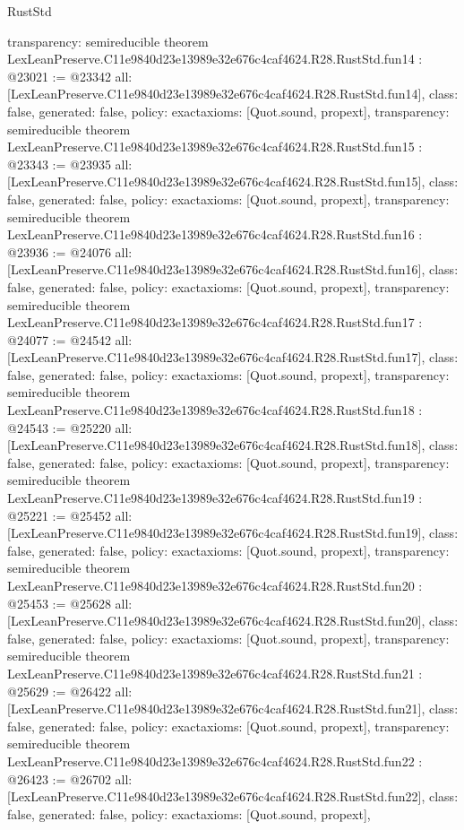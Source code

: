 \begin{lexlean}{RustStd}
\begin{coremodule}
{  transparency: semireducible
}
theorem LexLeanPreserve.C11e9840d23e13989e32e676c4caf4624.R28.RustStd.fun14 : @23021 := @23342 {
  all: [LexLeanPreserve.C11e9840d23e13989e32e676c4caf4624.R28.RustStd.fun14],
  class: false,
  generated: false,
  policy: exact{axioms: [Quot.sound, propext]},
  transparency: semireducible
}
theorem LexLeanPreserve.C11e9840d23e13989e32e676c4caf4624.R28.RustStd.fun15 : @23343 := @23935 {
  all: [LexLeanPreserve.C11e9840d23e13989e32e676c4caf4624.R28.RustStd.fun15],
  class: false,
  generated: false,
  policy: exact{axioms: [Quot.sound, propext]},
  transparency: semireducible
}
theorem LexLeanPreserve.C11e9840d23e13989e32e676c4caf4624.R28.RustStd.fun16 : @23936 := @24076 {
  all: [LexLeanPreserve.C11e9840d23e13989e32e676c4caf4624.R28.RustStd.fun16],
  class: false,
  generated: false,
  policy: exact{axioms: [Quot.sound, propext]},
  transparency: semireducible
}
theorem LexLeanPreserve.C11e9840d23e13989e32e676c4caf4624.R28.RustStd.fun17 : @24077 := @24542 {
  all: [LexLeanPreserve.C11e9840d23e13989e32e676c4caf4624.R28.RustStd.fun17],
  class: false,
  generated: false,
  policy: exact{axioms: [Quot.sound, propext]},
  transparency: semireducible
}
theorem LexLeanPreserve.C11e9840d23e13989e32e676c4caf4624.R28.RustStd.fun18 : @24543 := @25220 {
  all: [LexLeanPreserve.C11e9840d23e13989e32e676c4caf4624.R28.RustStd.fun18],
  class: false,
  generated: false,
  policy: exact{axioms: [Quot.sound, propext]},
  transparency: semireducible
}
theorem LexLeanPreserve.C11e9840d23e13989e32e676c4caf4624.R28.RustStd.fun19 : @25221 := @25452 {
  all: [LexLeanPreserve.C11e9840d23e13989e32e676c4caf4624.R28.RustStd.fun19],
  class: false,
  generated: false,
  policy: exact{axioms: [Quot.sound, propext]},
  transparency: semireducible
}
theorem LexLeanPreserve.C11e9840d23e13989e32e676c4caf4624.R28.RustStd.fun20 : @25453 := @25628 {
  all: [LexLeanPreserve.C11e9840d23e13989e32e676c4caf4624.R28.RustStd.fun20],
  class: false,
  generated: false,
  policy: exact{axioms: [Quot.sound, propext]},
  transparency: semireducible
}
theorem LexLeanPreserve.C11e9840d23e13989e32e676c4caf4624.R28.RustStd.fun21 : @25629 := @26422 {
  all: [LexLeanPreserve.C11e9840d23e13989e32e676c4caf4624.R28.RustStd.fun21],
  class: false,
  generated: false,
  policy: exact{axioms: [Quot.sound, propext]},
  transparency: semireducible
}
theorem LexLeanPreserve.C11e9840d23e13989e32e676c4caf4624.R28.RustStd.fun22 : @26423 := @26702 {
  all: [LexLeanPreserve.C11e9840d23e13989e32e676c4caf4624.R28.RustStd.fun22],
  class: false,
  generated: false,
  policy: exact{axioms: [Quot.sound, propext]},
}
\end{coremodule}
\end{lexlean}
